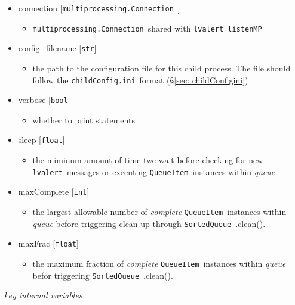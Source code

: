 \documentclass{article}
\newcommand{\multiprocessingConnection}{\texttt{multiprocessing.Connection}~}
\newcommand{\alert}{\texttt{lvalert}~}
\newcommand{\lvalertListenMP}{\texttt{lvalert\_listenMP}~}
\newcommand{\SortedQueue}{\texttt{SortedQueue}~}
\newcommand{\QueueItem}{\texttt{QueueItem}~}
\newcommand{\childConfigini}{\texttt{childConfig.ini}~}
\begin{document}
\begin{itemize}
    \item{connection [\multiprocessingConnection]
        \begin{itemize}
            \item{\multiprocessingConnection shared with \lvalertListenMP}
        \end{itemize}
         }
    \item{config\_filename [\texttt{str}]
        \begin{itemize}
            \item{the path to the configuration file for this child process. The file should follow the \childConfigini format (\S\ref{sec: childConfigini})}
        \end{itemize}
         }
    \item{verbose [\texttt{bool}]
        \begin{itemize}
            \item{whether to print statements}
        \end{itemize}
         }
    \item{sleep [\texttt{float}]
        \begin{itemize}
            \item{the miminum amount of time twe wait before checking for new \alert messages or executing \QueueItem instances within \textit{queue}}
        \end{itemize}
         }
    \item{maxComplete [\texttt{int}]
        \begin{itemize}
            \item{the largest allowable number of \textit{complete} \QueueItem instances within \textit{queue} before triggering clean-up through \SortedQueue.clean().}
        \end{itemize}
         }
    \item{maxFrac [\texttt{float}]
        \begin{itemize}
            \item{the maximum fraction of \textit{complete} \QueueItem instances within \textit{queue} befor triggering \SortedQueue.clean().}
        \end{itemize}
         }
\end{itemize}

\noindent
\textit{key internal variables}
\end{document}
